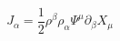 \begin{equation}
J_{\alpha}=\frac{1}{2}\rho^{\beta}\rho_{\alpha}\Psi^{\mu}\partial_{\beta}X_{\mu}
\end{equation}

